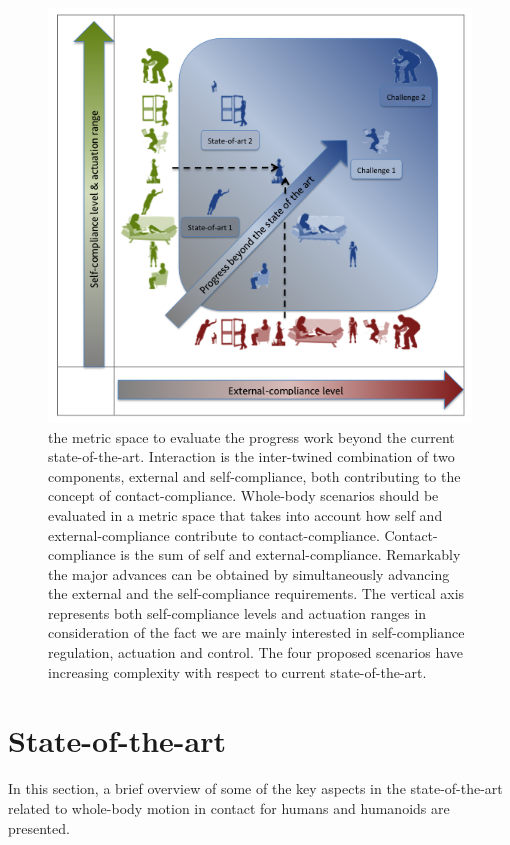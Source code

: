 \documentclass[final,5p,twocolumn]{elsarticle}
\begin{document}
\begin{figure}[!ht]
\centering
\includegraphics[width=\linewidth]{./images/classification3.png}
\caption{the metric space to evaluate the progress work beyond the current state-of-the-art. Interaction is the inter-twined combination of two components, external and self-compliance, both contributing to the concept of contact-compliance. Whole-body scenarios should be evaluated in a metric space that takes into account how self and external-compliance contribute to contact-compliance. Contact-compliance is the sum of self and external-compliance. Remarkably the major advances can be obtained by simultaneously advancing the external and the self-compliance requirements. The vertical axis represents both self-compliance levels and actuation ranges in consideration of the fact we are mainly interested in self-compliance regulation, actuation and control. The four proposed scenarios have increasing complexity with respect to current state-of-the-art. }
\label{fig:classification3}
\end{figure}

\section{State-of-the-art}

In this section, a brief overview of some of the key aspects in the state-of-the-art related to whole-body motion in contact for humans and humanoids are presented.
\end{document}
